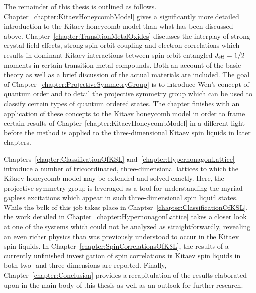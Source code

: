 The remainder of this thesis is outlined as follows.
Chapter~\ref{chapter:KitaevHoneycombModel} gives a significantly more detailed introduction to the Kitaev honeycomb model than what has been discussed above.
Chapter~\ref{chapter:TransitionMetalOxides} discusses the interplay of strong crystal field effects, strong spin-orbit coupling and electron correlations which results in dominant Kitaev interactions between spin-orbit entangled $J_{\rm eff} = 1/2$ moments in certain transition metal compounds.
Both an account of the basic theory as well as a brief discussion of the actual materials are included.
The goal of Chapter~\ref{chapter:ProjectiveSymmetryGroup} is to introduce Wen's concept of quantum order and to detail the projective symmetry group which can be used to classify certain types of quantum ordered states.
The chapter finishes with an application of these concepts to the Kitaev honeycomb model in order to frame certain results of Chapter~\ref{chapter:KitaevHoneycombModel} in a different light before the method is applied to the three-dimensional Kitaev spin liquids in later chapters.

Chapters~\ref{chapter:ClassificationOfKSL} and~\ref{chapter:HypernonagonLattice} introduce a number of tricoordinated, three-dimensional lattices to which the Kitaev honeycomb model may be extended and solved exactly.
Here, the projective symmetry group is leveraged as a tool for understanding the myriad gapless excitations which appear in such three-dimensional spin liquid states.
While the bulk of this job takes place in Chapter~\ref{chapter:ClassificationOfKSL}, the work detailed in Chapter~\ref{chapter:HypernonagonLattice} takes a closer look at one of the systems which could not be analyzed as straightforwardly, revealing an even richer physics than was previously understood to occur in the Kitaev spin liquids.
In Chapter~\ref{chapter:SpinCorrelationsOfKSL}, the results of a currently unfinished investigation of spin correlations in Kitaev spin liquids in both two- and three-dimensions are reported.
Finally, Chapter~\ref{chapter:Conclusion} provides a recapitulation of the results elaborated upon in the main body of this thesis as well as an outlook for further research.